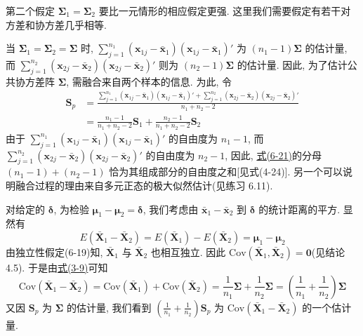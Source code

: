 第二个假定 $\boldsymbol{\Sigma}_{1}=\boldsymbol{\Sigma}_{2}$ 要比一元情形的相应假定更强. 这里我们需要假定有若干对方差和协方差几乎相等.

当 $\boldsymbol{\Sigma}_{1}=\boldsymbol{\Sigma}_{2}=\boldsymbol{\Sigma}$ 时, $\sum\limits_{j=1}^{n_{1}}(\mathbf{x}_{1j}-\bar{\mathbf{x}}_{1})(\mathbf{x}_{1j}-\bar{\mathbf{x}}_{1})'$ 为 $(n_{1}-1)\boldsymbol{\Sigma}$ 的估计量, 而 $\sum\limits_{j=1}^{n_{2}}(\mathbf{x}_{2j}-\bar{\mathbf{x}}_{2})(\mathbf{x}_{2j}-\bar{\mathbf{x}}_{2})'$ 则为 $(n_{2}-1)\boldsymbol{\Sigma}$ 的估计量. 因此, 为了估计公共协方差阵 $\boldsymbol{\Sigma}$, 需融合来自两个样本的信息. 为此, 令
\label{eq:6-21}
\begin{equation}
\begin{aligned}
\mathbf{S}_{p}&=\frac{\sum\limits_{j=1}^{n_{1}}(\mathbf{x}_{1j}-\bar{\mathbf{x}}_{1})(\mathbf{x}_{1j}-\bar{\mathbf{x}}_{1})'+\sum\limits_{j=1}^{n_{2}}(\mathbf{x}_{2j}-\bar{\mathbf{x}}_{2})(\mathbf{x}_{2j}-\bar{\mathbf{x}}_{2})'}{n_{1}+n_{2}-2}\\
&=\frac{n_{1}-1}{n_{1}+n_{2}-2}\mathbf{S}_{1}+\frac{n_{2}-1}{n_{1}+n_{2}-2}\mathbf{S}_{2}
\end{aligned}
\tag{6-21}
\end{equation}
由于 $\sum\limits_{j=1}^{n_{1}}(\mathbf{x}_{1j}-\bar{\mathbf{x}}_{1})(\mathbf{x}_{1j}-\bar{\mathbf{x}}_{1})'$ 的自由度为 $n_{1}-1$, 而 $\sum\limits_{j=1}^{n_{2}}(\mathbf{x}_{2j}-\bar{\mathbf{x}}_{2})(\mathbf{x}_{2j}-\bar{\mathbf{x}}_{2})'$ 的自由度为 $n_{2}-1$, 因此, \hyperref[eq:6-21]{式(6-21)}的分母 $(n_{1}-1)+(n_{2}-1)$ 恰为其组成部分的自由度之和[见式(4-24)]. 另一个可以说明融合过程的理由来自多元正态的极大似然估计(见练习 6.11).

对给定的 $\boldsymbol{\delta}$, 为检验 $\boldsymbol{\mu}_{1}-\boldsymbol{\mu}_{2}=\boldsymbol{\delta}$, 我们考虑由 $\bar{\mathbf{x}}_{1}-\bar{\mathbf{x}}_{2}$ 到 $\boldsymbol{\delta}$ 的统计距离的平方. 显然有
\[
E(\bar{\mathbf{X}}_{1}-\bar{\mathbf{X}}_{2})=E(\bar{\mathbf{X}}_{1})-E(\bar{\mathbf{X}}_{2})=\boldsymbol{\mu}_{1}-\boldsymbol{\mu}_{2}
\]
由独立性假定(6-19)知, $\bar{\mathbf{X}}_{1}$ 与 $\bar{\mathbf{X}}_{2}$ 也相互独立. 因此 $\mathrm{Cov}(\bar{\mathbf{X}}_{1},\bar{\mathbf{X}}_{2})=\mathbf{0}$(见结论 4.5). 于是由\hyperref[eq:3-9]{式(3-9)}可知
\label{eq:6-22}
\begin{equation}
\mathrm{Cov}(\bar{\mathbf{X}}_{1}-\bar{\mathbf{X}}_{2})=\mathrm{Cov}(\bar{\mathbf{X}}_{1})+\mathrm{Cov}(\bar{\mathbf{X}}_{2})=\frac{1}{n_{1}}\boldsymbol{\Sigma}+\frac{1}{n_{2}}\boldsymbol{\Sigma}=\left(\frac{1}{n_{1}}+\frac{1}{n_{2}}\right)\boldsymbol{\Sigma}
\tag{6-22}
\end{equation}
又因 $\mathbf{S}_{p}$ 为 $\boldsymbol{\Sigma}$ 的估计量, 我们看到 $\left(\frac{1}{n_{1}}+\frac{1}{n_{2}}\right)\mathbf{S}_{p}$ 为 $\mathrm{Cov}(\bar{\mathbf{X}}_{1}-\bar{\mathbf{X}}_{2})$ 的一个估计量.

